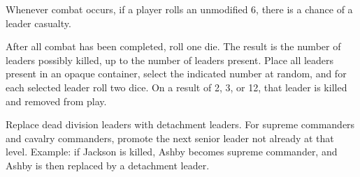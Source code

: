 
Whenever combat occurs, if a player rolls an unmodified 6, there is a chance of a leader casualty.

After all combat has been completed, roll one die. The result is the number of leaders possibly killed, up to the number of leaders present. Place all leaders present in an opaque container, select the indicated number at random, and for each selected leader roll two dice. On a result of 2, 3, or 12, that leader is killed and removed from play.

Replace dead division leaders with detachment leaders. For supreme commanders and cavalry commanders, promote the next senior leader not already at that level. Example: if Jackson is killed, Ashby becomes supreme commander, and Ashby is then replaced by a detachment leader.
